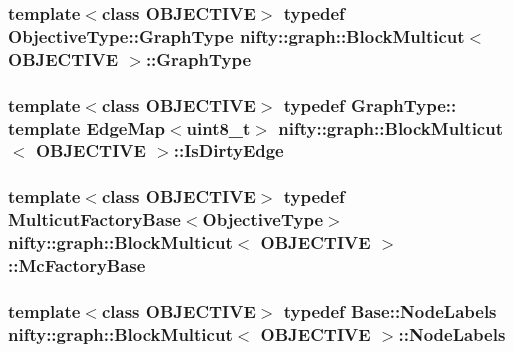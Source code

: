 \subsubsection[{Graph\+Type}]{\setlength{\rightskip}{0pt plus 5cm}template$<$class O\+B\+J\+E\+C\+T\+I\+V\+E$>$ typedef Objective\+Type\+::\+Graph\+Type {\bf nifty\+::graph\+::\+Block\+Multicut}$<$ O\+B\+J\+E\+C\+T\+I\+V\+E $>$\+::{\bf Graph\+Type}}\label{classnifty_1_1graph_1_1BlockMulticut_aa4c491df2afb630fd1a9897a2bc24d89}
\hypertarget{classnifty_1_1graph_1_1BlockMulticut_afa9cc25eb3e220d66fffaa687f18f4ad}{}
\subsubsection[{Is\+Dirty\+Edge}]{\setlength{\rightskip}{0pt plus 5cm}template$<$class O\+B\+J\+E\+C\+T\+I\+V\+E$>$ typedef Graph\+Type\+:: template Edge\+Map$<$uint8\+\_\+t$>$ {\bf nifty\+::graph\+::\+Block\+Multicut}$<$ O\+B\+J\+E\+C\+T\+I\+V\+E $>$\+::{\bf Is\+Dirty\+Edge}}\label{classnifty_1_1graph_1_1BlockMulticut_afa9cc25eb3e220d66fffaa687f18f4ad}
\hypertarget{classnifty_1_1graph_1_1BlockMulticut_a59d6c0f5c4f2b8cf5c715371fab907a7}{}
\subsubsection[{Mc\+Factory\+Base}]{\setlength{\rightskip}{0pt plus 5cm}template$<$class O\+B\+J\+E\+C\+T\+I\+V\+E$>$ typedef {\bf Multicut\+Factory\+Base}$<${\bf Objective\+Type}$>$ {\bf nifty\+::graph\+::\+Block\+Multicut}$<$ O\+B\+J\+E\+C\+T\+I\+V\+E $>$\+::{\bf Mc\+Factory\+Base}}\label{classnifty_1_1graph_1_1BlockMulticut_a59d6c0f5c4f2b8cf5c715371fab907a7}
\hypertarget{classnifty_1_1graph_1_1BlockMulticut_a5ee7c08b785b538685e3e30a93586d39}{}
\subsubsection[{Node\+Labels}]{\setlength{\rightskip}{0pt plus 5cm}template$<$class O\+B\+J\+E\+C\+T\+I\+V\+E$>$ typedef {\bf Base\+::\+Node\+Labels} {\bf nifty\+::graph\+::\+Block\+Multicut}$<$ O\+B\+J\+E\+C\+T\+I\+V\+E $>$\+::{\bf Node\+Labels}}\label{classnifty_1_1graph_1_1BlockMulticut_a5ee7c08b785b538685e3e30a93586d39}
\hypertarget{classnifty_1_1graph_1_1BlockMulticut_a5a0258cebb392718a4565551cd43ab89}{}

